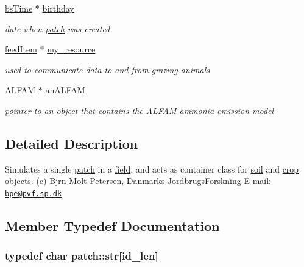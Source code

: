 \begin{DoxyCompactItemize}
\hyperlink{classbs_time}{bsTime} $\ast$ \hyperlink{classpatch_ae0688668c13cf1087e8c2df0b7ddcd3b}{birthday}
\begin{DoxyCompactList}\small\item\em date when \hyperlink{classpatch}{patch} was created \item\end{DoxyCompactList}\item 
\hyperlink{classfeed_item}{feedItem} $\ast$ \hyperlink{classpatch_a97e7c201cc90ebbdc6035a8465ebbaf2}{my\_\-resource}
\begin{DoxyCompactList}\small\item\em used to communicate data to and from grazing animals \item\end{DoxyCompactList}\item 
\hyperlink{class_a_l_f_a_m}{ALFAM} $\ast$ \hyperlink{classpatch_ab5f7d71681c2f3a154051907c3d1cd3d}{anALFAM}
\begin{DoxyCompactList}\small\item\em pointer to an object that contains the \hyperlink{class_a_l_f_a_m}{ALFAM} ammonia emission model \item\end{DoxyCompactList}\end{DoxyCompactItemize}


\subsection{Detailed Description}
Simulates a single \hyperlink{classpatch}{patch} in a \hyperlink{classfield}{field}, and acts as container class for \hyperlink{classsoil}{soil} and \hyperlink{classcrop}{crop} objects. (c) Bjrn Molt Petersen, Danmarks JordbrugsForskning E-\/mail: \href{mailto:bpe@pvf.sp.dk}{\tt bpe@pvf.sp.dk} 

\subsection{Member Typedef Documentation}
\hypertarget{classpatch_a88e54bffc2427ce8f8afe0c673b76030}{
\subsubsection[{str}]{\setlength{\rightskip}{0pt plus 5cm}typedef char {\bf patch::str}\mbox{[}id\_\-len\mbox{]}}}
\label{classpatch_a88e54bffc2427ce8f8afe0c673b76030}


